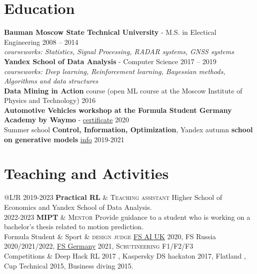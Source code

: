 \documentclass[12pt, a4paper]{extarticle}
\newcommand\boldgrey[1]{\textcolor{mygray}{\textbf{#1}}}
\newcommand*{\sectionformat}{\centering}
\newcommand\VRule{\color{lightgray}\vrule width 0.5pt}
\begin{document}
\section*{\sectionformat Education}
\textbf{Bauman Moscow State Technical University} - M.S. in Electical Engineering \hfill 2008 -- 2014 \\
\textit{courseworks: Statistics, Signal Processing, RADAR systems, GNSS systems} \\
% 
\textbf{Yandex School of Data Analysis} - Computer Science \hfill 2017 -- 2019 \\
\textit{courseworks: Deep learning, Reinforcement learning, Bayessian methods, Algorithms and data structures} \\
% 
\textbf{Data Mining in Action} course (open ML course at the Moscow Institute of Physics and Technology) \hfill    2016         \\
% 
%
\textbf{Automotive Vehicles workshop at the Formula Student Germany Academy by Waymo} - \href{https://drive.google.com/file/d/1-WxECccxBrRWIvEt9WQeXKTueiF658r7/view?usp=sharing}{certificate}   \hfill  2020       \\
% 
Summer school \textbf{Control, Information, Optimization}, Yandex autumn \textbf{school on generative models} \href{https://indico.cern.ch/event/1082512/timetable/#20211123}{info}                  \hfill  2019-2021
\nolinebreak
%
\section*{\sectionformat Teaching and Activities}
\begin{tabular}{@{}L!{\VRule}R}
	2019-2023  {\boldgrey{Practical RL}} &
	{\textsc{Teaching assistant}} Higher School of Economics and Yandex School of Data Analysis.
	\\
	2022-2023 {\boldgrey{MIPT}}
	                                     & {\textsc{Mentor}} Provide guidance to a student who is working on a bachelor's thesis related to motion prediction.
	\\
	Formula Student \& Sport             &
	{\textsc{design judge}} \href{https://www.imeche.org/events/formula-student/team-information/fs-ai}{FS AI UK} 2020, FS Russia 2020/2021/2022, \href{https://www.formulastudent.de/fsg/}{FS Germany} 2021,
	{\textsc{Scrutineering F1/F2/F3}}
	\\
	Competitions                         &
	Deep Hack RL 2017 ,
	Kaspersky DS hackaton 2017,
	Flatland ,
	Cup Technical 2015,
	Business diving 2015.
\end{tabular}
%
\end{document}
